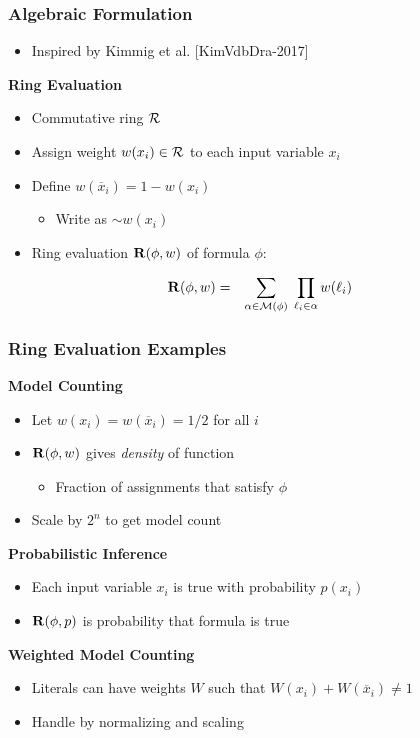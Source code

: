\documentclass[t,pdf]{beamer}
\newcommand{\reference}[1]{{\footnotesize [#1]}}
\newcommand{\oneg}[1]{\overline{#1}}
\newcommand{\bitem}{\item[$\bullet$]}
\newcommand{\xnot}{\oneg{x}}
\newcommand{\pneg}{{\sim}}
\begin{document}
\begin{frame}

   \frametitle{Algebraic Formulation}
   \begin{itemize}
     \item Inspired by Kimmig et al. \reference{KimVdbDra-2017}
   \end{itemize}

\medskip
{\bf Ring Evaluation}
\begin{itemize}
     \item Commutative ring ${\cal R}$ 
     \item Assign weight $w(x_i) \in {\cal R}$ to each input variable $x_i$
     \item Define $w(\xnot_i) = 1-w(x_i)$
       \begin{itemize}
         \bitem Write as $\pneg w(x_i)$
       \end{itemize}
     \item Ring evaluation ${\bf R}(\phi, w)$ of formula $\phi$:
   \end{itemize}
   \begin{eqnarray*}
     {\bf R}(\phi, w) & = & \sum_{\alpha \in {\cal M}(\phi)} \; \prod_{\ell_i \in \alpha} w(\ell_i)
   \end{eqnarray*}
\end{frame}

\begin{frame}
\frametitle{Ring Evaluation Examples}

\bigskip

{\bf Model Counting}
\begin{itemize}
\item Let $w(x_i) = w(\oneg{x}_i) = 1/2$ for all $i$
\item ${\bf R}(\phi, w)$ gives {\em density} of function
  \begin{itemize}
    \bitem Fraction of assignments that satisfy $\phi$
  \end{itemize}
\item Scale by $2^n$ to get model count
\end{itemize}

\medskip

{\bf Probabilistic Inference}
\begin{itemize}
\item Each input variable $x_i$ is true with probability $p(x_i)$
\item ${\bf R}(\phi, p)$ is probability that formula is true
\end{itemize}

\medskip

{\bf Weighted Model Counting}
\begin{itemize}
\item Literals can have weights $W$ such that $W(x_i) + W(\oneg{x}_i) \not = 1$
\item Handle by normalizing and scaling  
\end{itemize}

\end{frame}
\end{document}
